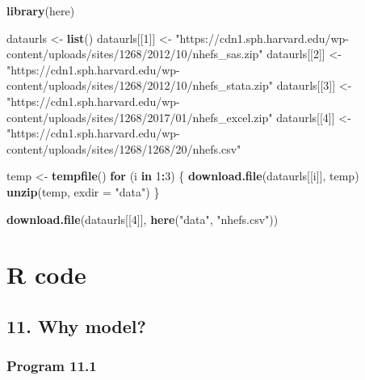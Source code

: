 \documentclass[
  10pt,
]{book}
\newenvironment{Shaded}{\begin{snugshade}}{\end{snugshade}}
\newcommand{\ControlFlowTok}[1]{\textcolor[rgb]{0.13,0.29,0.53}{\textbf{#1}}}
\newcommand{\DataTypeTok}[1]{\textcolor[rgb]{0.13,0.29,0.53}{#1}}
\newcommand{\DecValTok}[1]{\textcolor[rgb]{0.00,0.00,0.81}{#1}}
\newcommand{\KeywordTok}[1]{\textcolor[rgb]{0.13,0.29,0.53}{\textbf{#1}}}
\newcommand{\NormalTok}[1]{#1}
\newcommand{\OperatorTok}[1]{\textcolor[rgb]{0.81,0.36,0.00}{\textbf{#1}}}
\newcommand{\StringTok}[1]{\textcolor[rgb]{0.31,0.60,0.02}{#1}}
\begin{document}
\begin{Shaded}
\begin{Highlighting}[]
\KeywordTok{library}\NormalTok{(here)}
\end{Highlighting}
\end{Shaded}

\begin{Shaded}
\begin{Highlighting}[]
\NormalTok{dataurls <-}\StringTok{ }\KeywordTok{list}\NormalTok{()}
\NormalTok{dataurls[[}\DecValTok{1}\NormalTok{]] <-}\StringTok{ "https://cdn1.sph.harvard.edu/wp-content/uploads/sites/1268/2012/10/nhefs_sas.zip"}
\NormalTok{dataurls[[}\DecValTok{2}\NormalTok{]] <-}\StringTok{ "https://cdn1.sph.harvard.edu/wp-content/uploads/sites/1268/2012/10/nhefs_stata.zip"}
\NormalTok{dataurls[[}\DecValTok{3}\NormalTok{]] <-}\StringTok{ "https://cdn1.sph.harvard.edu/wp-content/uploads/sites/1268/2017/01/nhefs_excel.zip"}
\NormalTok{dataurls[[}\DecValTok{4}\NormalTok{]] <-}\StringTok{ "https://cdn1.sph.harvard.edu/wp-content/uploads/sites/1268/1268/20/nhefs.csv"}

\NormalTok{temp <-}\StringTok{ }\KeywordTok{tempfile}\NormalTok{()}
\ControlFlowTok{for}\NormalTok{ (i }\ControlFlowTok{in} \DecValTok{1}\OperatorTok{:}\DecValTok{3}\NormalTok{) \{}
    \KeywordTok{download.file}\NormalTok{(dataurls[[i]], temp)}
    \KeywordTok{unzip}\NormalTok{(temp, }\DataTypeTok{exdir =} \StringTok{"data"}\NormalTok{)}
\NormalTok{\}}

\KeywordTok{download.file}\NormalTok{(dataurls[[}\DecValTok{4}\NormalTok{]], }\KeywordTok{here}\NormalTok{(}\StringTok{"data"}\NormalTok{, }\StringTok{"nhefs.csv"}\NormalTok{))}
\end{Highlighting}
\end{Shaded}

\mainmatter

\hypertarget{part-r-code}{%
\part*{R code}\label{part-r-code}}

\hypertarget{why-model}{%
\chapter*{11. Why model?}\label{why-model}}

\hypertarget{program-11.1}{%
\section{Program 11.1}\label{program-11.1}}
\end{document}
